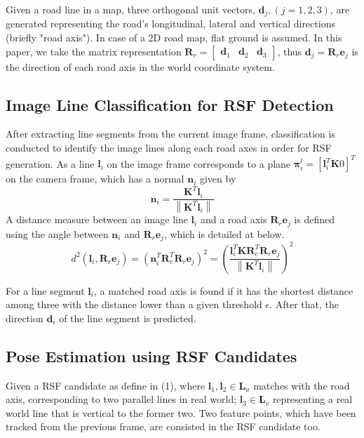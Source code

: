 \documentclass[letterpaper, 10 pt, conference]{ieeeconf}  %
\begin{document}
Given a road line in a map, three orthogonal unit vectors, $\mathbf{d}_j, (j=1,2,3)$, are generated representing the road's longitudinal, lateral and vertical directions (briefly "road axis"). In case of a 2D road map, flat ground is assumed. In this paper, we take the matrix representation $\mathbf{R}_r = \begin{bmatrix} \mathbf{d}_1 & \mathbf{d}_2 & \mathbf{d}_3 \end{bmatrix}$, thus $\mathbf{d}_j = \mathbf{R}_r\mathbf{e}_j$ is the direction of each road axis in the world coordinate system.

\subsection{Image Line Classification for RSF Detection}

After extracting line segments from the current image frame, classification is conducted to identify the image lines along each road axes in order for RSF generation.
As a line $\mathbf{l}_i$ on the image frame corresponds to a plane $\mathbf{\pi}_i^l = \left[\mathbf{l}_i^T\mathbf{K} 0\right]^T$ on the camera frame, which has a normal $\mathbf{n}_i$ given by
\begin{equation}
\mathbf{n}_i=\frac{\mathbf{K}^T\mathbf{l}_i}{\left\|\mathbf{K}^T\mathbf{l}_i\right\|}
\end{equation}
A distance measure between an image line $\mathbf{l}_i$ and a road axis $\mathbf{R}_r\mathbf{e}_j$ is defined using the angle between $\mathbf{n}_i$ and $\mathbf{R}_r\mathbf{e}_j$, which is detailed at below.
\begin{equation}
d^2(\mathbf{l}_i,\mathbf{R}_r\mathbf{e}_j) = {\left(\mathbf{n}_i^T\mathbf{R}_c^T\mathbf{R}_r\mathbf{e}_j\right)}^2 = { \left(\frac  {\mathbf{l}_i^T\mathbf{K}\mathbf{R}_c^T\mathbf{R}_r\mathbf{e}_j}
                {\left\|\mathbf{K}^T\mathbf{l}_i\right\|}
    \right)
  }^2
\label{eq:d_3d}
\end{equation}

For a line segment $\mathbf{l}_i$, a matched road axis is found if it has the shortest distance among three with the distance lower than a given threshold $\epsilon$. After that, the direction $\mathbf{d}_i$ of the line segment is predicted.

\subsection{Pose Estimation using RSF Candidates}
Given a RSF candidate as define in (1), where $\mathbf{l}_1,\mathbf{l}_2\in \mathbf{L}_u$ matches with the road axis, corresponding to two parallel lines in real world; $\mathbf{l}_3\in \mathbf{L}_v$ representing a real world line that is vertical to the former two. Two feature points, which have been tracked from the previous frame, are consisted in the RSF candidate too.
\end{document}
